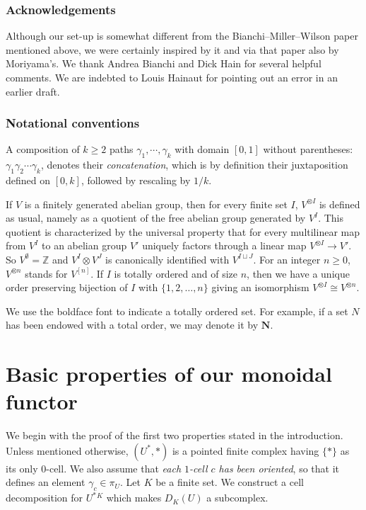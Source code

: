 \documentclass[12pt,letterpaper]{amsart}
\numberwithin{equation}{section}
\def\Nbold{{\mathbf N}}
\def\ZZ{{\mathbb Z}}
\def\g{\gamma}
\theoremstyle{remark}
\begin{document}
\subsubsection*{Acknowledgements} 
Although our set-up  is somewhat different  from the  Bianchi--Miller--Wilson paper mentioned above,  
we were certainly inspired by it  and via that paper also by Moriyama's.  We thank  Andrea Bianchi and  Dick Hain  for several helpful comments. We are indebted to Louis Hainaut for pointing out an error in an earlier draft.
\smallskip

\subsubsection*{Notational conventions}
A composition  of  $k\ge 2$  paths 
$\g_1,\cdots ,\g_k$ with domain $[0,1]$ without parentheses: $\g_1\g_2\cdots \g_k$,  denotes their \emph{concatenation}, which is by definition their juxtaposition defined on $[0,k]$, followed by rescaling by $1/k$.


If $V$ is a finitely generated abelian  group,  then for every finite set $I$, $V^{\otimes I}$ is defined as usual, namely as a quotient of the free abelian group generated by $V^I$. This quotient is characterized by the universal  property that for every  multilinear map from $V^I$ to an abelian group $V'$ uniquely  factors through a linear map $V^{\otimes I}\to V'$. So $V^\emptyset =\ZZ$ and $V^{I}\otimes V^J$ is canonically identified with $V^{I\sqcup J}$. For an integer $n\ge 0$, $V^{\otimes n}$ stands for $V^{[n]}$. If $I$ is totally ordered and of size $n$, then we have a unique order preserving bijection of $I$ with $\{1,2, \dots ,n\}$ giving  an isomorphism $V^{\otimes I} \cong V^{\otimes n}$. 

We use the boldface font to indicate a totally ordered  set. For example, if a set  $N$ has been endowed with a total order, we may denote it by $\Nbold$.
\medskip

\tableofcontents

\section{Basic properties of our monoidal functor}
We begin with the proof of the first two properties stated in the introduction. Unless mentioned otherwise, $(U^*,*)$ is a pointed  finite complex  having $\{*\}$ as its only $0$-cell.  We also assume that \emph{each $1$-cell $c$ has been oriented}, so that it defines an element  $\g_c\in\pi_U$. {Let $K$ be a finite set.} We construct a  cell decomposition for $U^*{}^K$ which makes  $D_K(U)$ a subcomplex.
\end{document}
